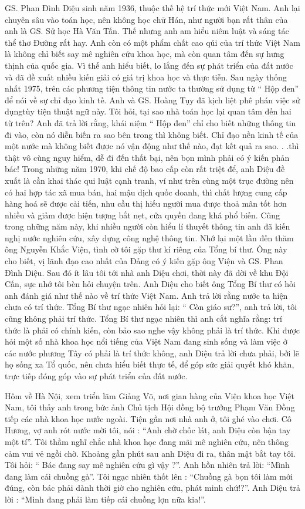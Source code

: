 GS. Phan Đình Diệu sinh năm 1936, thuộc thế hệ trí thức mới Việt Nam. Anh lại chuyên sâu vào toán học, nên không học chữ Hán, như người bạn rất thân của anh là GS. Sử học Hà Văn Tấn. Thế nhưng anh am hiểu niêm luật và sáng tác thể thơ Đường rất hay. Anh còn có một phẩm chất cao qúi của trí thức Việt Nam là không chỉ biết say mê nghiên cứu khoa học, mà còn quan tâm đến sự hưng thịnh của quốc gia. Vì thế anh hiểu biết, lo lắng đến sự phát triển của đất nước và đã đề xuất nhiều kiến giải có giá trị khoa học và thực tiễn. Sau ngày thống nhất 1975, trên các phương tiện thông tin nước ta thường sử dụng từ “  Hộp đen” để nói về sự chỉ đạo kinh tế. Anh và GS. Hoàng Tụy đã kịch liệt phê phán việc sử dụngtùy tiện thuật ngữ này. Tôi hỏi, tại sao nhà toán học lại quan tâm đến hai từ trên? Anh đã trả lời rằng, khái niệm “ Hộp đen” chỉ cho biết những thông tin đi vào, còn nó diễn biến ra sao bên trong thì không biết. Chỉ đạo nền kinh tế của một nước mà không biết được nó vận động như thế nào, đạt kết quả ra sao. . .thì thật vô cùng nguy hiểm, dễ đi đến thất bại, nên bọn mình phải có ý kiến phản bác! Trong những năm 1970, khi chế độ bao cấp còn rất triệt để, anh Diệu đề xuất là cần khai thác qui luật cạnh tranh, ví như trên cùng một trục đường nên có hai hợp tác xã mua bán, hai mậu dịch quốc doanh, thì chất lượng cung cấp hàng hoá sẽ được cải tiến, nhu cầu thị hiếu người mua được thoả mãn tốt hơn nhiều và giảm được hiện tượng bắt nẹt, cửa quyền đang khá phổ biến. Cũng trong những năm này, khi nhiều người còn hiểu lí thuyết thông tin anh đã kiến nghị nước nghiên cứu, xây dựng công nghệ thông tin. Nhớ lại một lần đến thăm ông Nguyễn Khắc Viện, tình cờ tôi gặp thư kí riêng của Tổng bí thư. Ông này cho biết, vị lãnh đạo cao nhất của Đảng có ý kiến gặp ông Viện và GS. Phan Đình Diệu. Sau đó ít lâu tôi tới nhà anh Diệu chơi, thời này đã dời về khu Đội Cấn, sực nhớ tôi bèn hỏi chuyện trên. Anh Diệu cho biết ông Tổng Bí thư có hỏi anh đánh giá như thế nào về trí thức Việt Nam. Anh trả lời rằng nước ta hiện chưa có trí thức. Tổng Bí thư ngạc nhiên hỏi lại: “ Còn giáo sư?”, anh trả lời, tôi cũng không phải trí thức. Tổng Bí thư ngạc nhiên thì anh cắt nghĩa rằng: trí thức là phải có chính kiến, còn bảo sao nghe vậy không phải là trí thức. Khi được hỏi một số nhà khoa học nổi tiếng của Việt Nam đang sinh sống và làm việc ở các nước phương Tây có phải là trí thức không, anh Diệu trả lời chưa phải, bởi lẽ họ sống xa Tổ quốc, nên chưa hiểu biết thực tế, để góp sức giải quyết khó khăn, trực tiếp đóng góp vào sự phát triển của đất nước.

Hôm về Hà Nội, xem triển lãm Giảng Võ, nơi gian hàng của Viện khoa học Việt Nam, tôi thấy anh trong bức ảnh Chủ tịch Hội đồng bộ trưởng Phạm Văn Đồng tiếp các nhà khoa học nước ngoài. Tiện gần nơi nhà anh ở, tôi ghé vào chơi. Cô Hương, vợ anh rót nước mời tôi, nói : “Anh chờ chốc lát, anh Diệu còn bận tay một tí”. Tôi thầm nghĩ chắc nhà khoa học đang mãi mê nghiên cứu, nên thông cảm vui vẻ ngồi chờ.  Khoảng gần phút sau anh Diệu đi ra, thân mật bắt tay tôi. Tôi hỏi: “ Bác đang say mê nghiên cứu gì vậy ?”. Anh hồn nhiên trả lời: “Mình đang làm cái chuồng gà”. Tôi ngạc nhiên thốt lên : “Chuồng gà bọn tôi làm mới đúng, còn bác phải dành thời giờ cho nghiên cứu, phát minh chứ!?”.  Anh Diệu trả lời : “Mình đang phải làm tiếp cái chuồng lợn nữa kia!”.

